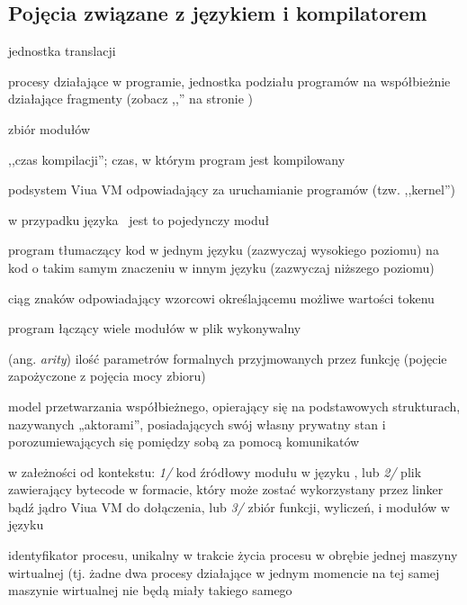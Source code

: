 \subsection{Pojęcia związane z językiem i kompilatorem}
\label{slownik_pojec_jezyka}

\begin{labeling}{jednostka translacji}
    \item[aktory] procesy działające w programie, jednostka podziału programów
        na współbieżnie działające fragmenty (zobacz
        ,,'' na stronie \pageref{glossary_actors})
    \item[biblioteka] zbiór modułów
    \item[\emph{compile-time}] ,,czas kompilacji''; czas, w którym program jest kompilowany
    \item[jądro] podsystem Viua VM odpowiadający za uruchamianie programów (tzw. ,,kernel'')
    \item[jednostka translacji] w przypadku języka \ViuAct\ jest to pojedynczy moduł
    \item[kompilator] program tłumaczący kod w jednym języku (zazwyczaj wysokiego poziomu) na kod o takim
        samym znaczeniu w innym języku (zazwyczaj niższego poziomu)
    \item[leksem] ciąg znaków odpowiadający wzorcowi określającemu możliwe wartości tokenu
    \item[linker] program łączący wiele modułów w plik wykonywalny
    \item[moc funkcji] (ang. \emph{arity}) ilość parametrów formalnych przyjmowanych przez funkcję (pojęcie
        zapożyczone z pojęcia mocy zbioru)
    \item [model aktorów] model przetwarzania współbieżnego, opierający się na
        podstawowych strukturach, nazywanych „aktorami”, posiadających swój
        własny prywatny stan i porozumiewających się pomiędzy sobą za pomocą
        komunikatów
    \item[moduł] w załeżności od kontekstu: \emph{1/} kod źródłowy modułu w języku \ViuAct, lub \emph{2/} plik
        zawierający bytecode w formacie, który może zostać wykorzystany przez linker bądź jądro Viua VM do
        dołączenia, lub \emph{3/} zbiór funkcji, wyliczeń, i modułów w języku \ViuAct
    \item[PID] identyfikator procesu, unikalny w trakcie życia procesu w obrębie
        jednej maszyny wirtualnej (tj. żadne dwa procesy działające w jednym
        momencie na tej samej maszynie wirtualnej nie będą miały takiego samego

\end{labeling}
